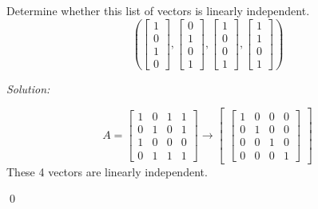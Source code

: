 \documentclass[11 pt]{article}
\newenvironment{problem}[2][Problem]{\begin{trivlist}
\item[\hskip \labelsep {\bfseries #1}\hskip \labelsep {\bfseries #2.}]}{\end{trivlist}}
\newenvironment{sol}
    {\emph{Solution:}
    }
    {
    \qed
    }
\theoremstyle{definition}
\begin{document}
\begin{problem}{3.1.2d}
Determine whether this list of vectors is linearly independent. \\
\[\left (\begin{bmatrix}
1 \\ 0 \\ 1 \\ 0
\end{bmatrix},
\begin{bmatrix}
0 \\ 1 \\ 0 \\ 1
\end{bmatrix},
\begin{bmatrix}
1\\0\\0\\1
\end{bmatrix},
\begin{bmatrix}
1 \\ 1 \\ 0 \\ 1
\end{bmatrix}
\right )\]
\end{problem}

\begin{sol}
\[A=\begin{bmatrix}
1 & 0 & 1 & 1\\
0 & 1 & 0 & 1\\
1 & 0 & 0 & 0\\
0 & 1 & 1 & 1
\end{bmatrix}\xrightarrow{}\begin{bmatrix}
\begin{bmatrix}
1 & 0 & 0 & 0\\
0 & 1 & 0 & 0\\
0 & 0 & 1 & 0\\
0 & 0 & 0 & 1
\end{bmatrix}
\end{bmatrix}\]
These 4 vectors are linearly independent.
\end{sol}
\end{document}
